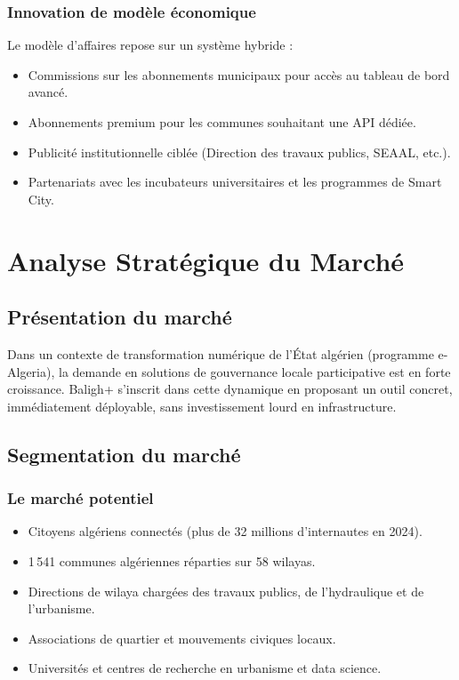 \documentclass[12pt,a4paper]{report}
\begin{document}
\subsection{Innovation de modèle économique}
Le modèle d'affaires repose sur un système hybride :
\begin{itemize}
  \item Commissions sur les abonnements municipaux pour accès au tableau de
        bord avancé.
  \item Abonnements premium pour les communes souhaitant une API dédiée.
  \item Publicité institutionnelle ciblée (Direction des travaux publics,
        SEAAL, etc.).
  \item Partenariats avec les incubateurs universitaires et les programmes de
        Smart City.
\end{itemize}

\chapter{Analyse Stratégique du Marché}

\section{Présentation du marché}

Dans un contexte de transformation numérique de l'État algérien (programme
e-Algeria), la demande en solutions de gouvernance locale participative est en
forte croissance. Baligh+ s'inscrit dans cette dynamique en proposant un outil
concret, immédiatement déployable, sans investissement lourd en infrastructure.

\section{Segmentation du marché}

\subsection{Le marché potentiel}
\begin{itemize}
  \item Citoyens algériens connectés (plus de 32 millions d'internautes en 2024).
  \item 1\,541 communes algériennes réparties sur 58 wilayas.
  \item Directions de wilaya chargées des travaux publics, de l'hydraulique et
        de l'urbanisme.
  \item Associations de quartier et mouvements civiques locaux.
  \item Universités et centres de recherche en urbanisme et data science.
\end{itemize}
\end{document}
